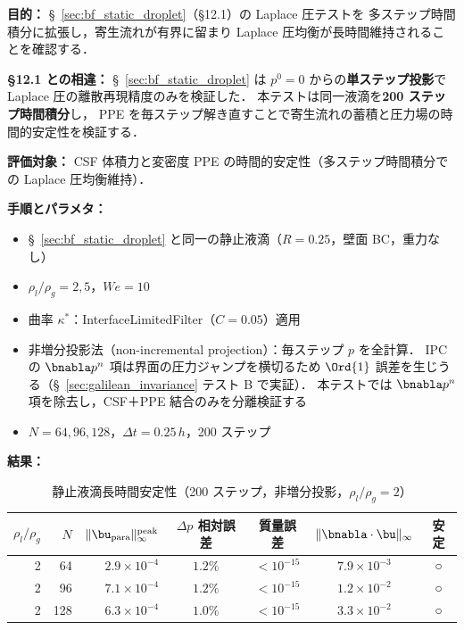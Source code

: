 \noindent\textbf{目的：}
§~\ref{sec:bf_static_droplet}（§12.1）の Laplace 圧テストを
多ステップ時間積分に拡張し，寄生流れが有界に留まり
Laplace 圧均衡が長時間維持されることを確認する．

\noindent\textbf{§12.1 との相違：}
§~\ref{sec:bf_static_droplet} は $p^0 = 0$ からの\textbf{単ステップ投影}で
Laplace 圧の離散再現精度のみを検証した．
本テストは同一液滴を\textbf{200 ステップ時間積分}し，
PPE を毎ステップ解き直すことで寄生流れの蓄積と圧力場の時間的安定性を検証する．

\noindent\textbf{評価対象：}
CSF 体積力と変密度 PPE の時間的安定性（多ステップ時間積分での Laplace 圧均衡維持）．

\noindent\textbf{手順とパラメタ：}
\begin{itemize}[noitemsep]
  \item §~\ref{sec:bf_static_droplet} と同一の静止液滴（$R = 0.25$，壁面 BC，重力なし）
  \item $\rho_l/\rho_g = 2, 5$，$\mathit{We} = 10$
  \item 曲率 $\kappa^*$：InterfaceLimitedFilter（$C = 0.05$）適用
  \item 非増分投影法（non-incremental projection）：毎ステップ $p$ を全計算．
        IPC の $\bnabla p^n$ 項は界面の圧力ジャンプを横切るため
        $\Ord{1}$ 誤差を生じうる（§~\ref{sec:galilean_invariance} テスト B で実証）．
        本テストでは $\bnabla p^n$ 項を除去し，CSF＋PPE 結合のみを分離検証する
  \item $N = 64, 96, 128$，$\Delta t = 0.25\,h$，200 ステップ
\end{itemize}

\noindent\textbf{結果：}

\begin{table}[htbp]
\centering
\caption{静止液滴長時間安定性（200 ステップ，非増分投影，$\rho_l/\rho_g = 2$）\protect\footnotemark}
\label{tab:static_longterm}
\renewcommand{\arraystretch}{1.3}
\begin{tabular}{rrrcccc}
\toprule
$\rho_l/\rho_g$ & $N$ &
$\|\bu_{\mathrm{para}}\|_\infty^{\mathrm{peak}}$ &
$\Delta p$ 相対誤差 & 質量誤差 &
$\|\bnabla\cdot\bu\|_\infty$ & 安定 \\
\midrule
2 &  64 & $2.9 \times 10^{-4}$ & $1.2\%$ & $< 10^{-15}$ & $7.9 \times 10^{-3}$ & ○ \\
2 &  96 & $7.1 \times 10^{-4}$ & $1.2\%$ & $< 10^{-15}$ & $1.2 \times 10^{-2}$ & ○ \\
2 & 128 & $6.3 \times 10^{-4}$ & $1.0\%$ & $< 10^{-15}$ & $3.3 \times 10^{-2}$ & ○ \\
\bottomrule
\end{tabular}
\end{table}

